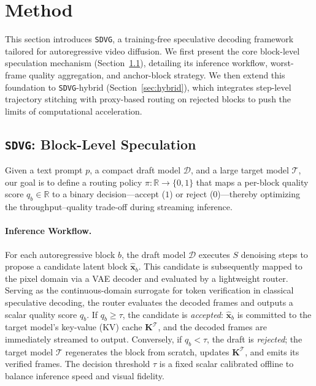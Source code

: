 \documentclass{article} %
\newcommand{\score}{q}
\newcommand{\threshold}{\tau}
\begin{document}
\section{Method}
\label{sec:method}

This section introduces \texttt{SDVG}, a training-free speculative decoding framework tailored for autoregressive video diffusion. We first present the core block-level speculation mechanism (Section~\ref{sec:block_speculation}), detailing its inference workflow, worst-frame quality aggregation, and anchor-block strategy. We then extend this foundation to \texttt{SDVG}-hybrid (Section~\ref{sec:hybrid}), which integrates step-level trajectory stitching with proxy-based routing on rejected blocks to push the limits of computational acceleration.

\subsection{\texttt{SDVG}: Block-Level Speculation}
\label{sec:block_speculation}

Given a text prompt $p$, a compact draft model $\mathcal{D}$, and a large target model $\mathcal{T}$, our goal is to define a routing policy $\pi: \mathbb{R} \to \{0, 1\}$ that maps a per-block quality score $\score_b \in \mathbb{R}$ to a binary decision—accept ($1$) or reject ($0$)—thereby optimizing the throughput--quality trade-off during streaming inference.

\paragraph{Inference Workflow.}
For each autoregressive block $b$, the draft model $\mathcal{D}$ executes $S$ denoising steps to propose a candidate latent block $\hat{\mathbf{x}}_b$. This candidate is subsequently mapped to the pixel domain via a VAE decoder and evaluated by a lightweight router. Serving as the continuous-domain surrogate for token verification in classical speculative decoding, the router evaluates the decoded frames and outputs a scalar quality score $\score_b$. If $\score_b \geq \threshold$, the candidate is \emph{accepted}: $\hat{\mathbf{x}}_b$ is committed to the target model's key-value (KV) cache $\mathbf{K}^{\mathcal{T}}$, and the decoded frames are immediately streamed to output. Conversely, if $\score_b < \threshold$, the draft is \emph{rejected}; the target model $\mathcal{T}$ regenerates the block from scratch, updates $\mathbf{K}^{\mathcal{T}}$, and emits its verified frames. The decision threshold $\threshold$ is a fixed scalar calibrated offline to balance inference speed and visual fidelity.
\end{document}
